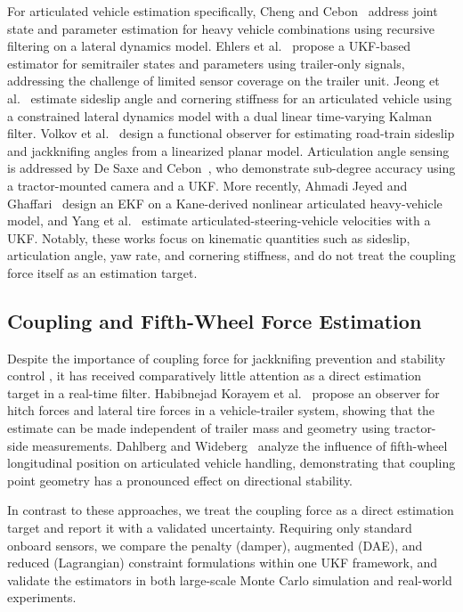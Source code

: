 \documentclass[conference]{IEEEtran}
\begin{document}
For articulated vehicle estimation specifically, Cheng and Cebon~\cite{cheng_parameter_2011} address joint state and parameter estimation for heavy vehicle combinations using recursive filtering on a lateral dynamics model. Ehlers et al.~\cite{ehlers_state_2022} propose a UKF-based estimator for semitrailer states and parameters using trailer-only signals, addressing the challenge of limited sensor coverage on the trailer unit. Jeong et al.~\cite{jeong_estimation_2022} estimate sideslip angle and cornering stiffness for an articulated vehicle using a constrained lateral dynamics model with a dual linear time-varying Kalman filter. Volkov et al.~\cite{volkov_road_2021} design a functional observer for estimating road-train sideslip and jackknifing angles from a linearized planar model. Articulation angle sensing is addressed by De Saxe and Cebon~\cite{de_saxe_visual_2015}, who demonstrate sub-degree accuracy using a tractor-mounted camera and a UKF. More recently, Ahmadi Jeyed and Ghaffari~\cite{ahmadi_jeyed_nonlinear_2019} design an EKF on a Kane-derived nonlinear articulated heavy-vehicle model, and Yang et al.~\cite{yang_unscented_2023} estimate articulated-steering-vehicle velocities with a UKF. Notably, these works focus on kinematic quantities such as sideslip, articulation angle, yaw rate, and cornering stiffness, and do not treat the coupling force itself as an estimation target.

\subsection{Coupling and Fifth-Wheel Force Estimation}

Despite the importance of coupling force for jackknifing prevention and stability control \cite{erdinc_safe_2023, deng_parametric_2003}, it has received comparatively little attention as a direct estimation target in a real-time filter. Habibnejad Korayem et al.~\cite{habibnejad_korayem_estimation_2022} propose an observer for hitch forces and lateral tire forces in a vehicle-trailer system, showing that the estimate can be made independent of trailer mass and geometry using tractor-side measurements. Dahlberg and Wideberg~\cite{dahlberg_influence_nodate} analyze the influence of fifth-wheel longitudinal position on articulated vehicle handling, demonstrating that coupling point geometry has a pronounced effect on directional stability.

In contrast to these approaches, we treat the coupling force as a direct estimation target and report it with a validated uncertainty. Requiring only standard onboard sensors, we compare the penalty (damper), augmented (DAE), and reduced (Lagrangian) constraint formulations within one UKF framework, and validate the estimators in both large-scale Monte Carlo simulation and real-world experiments.
\end{document}
